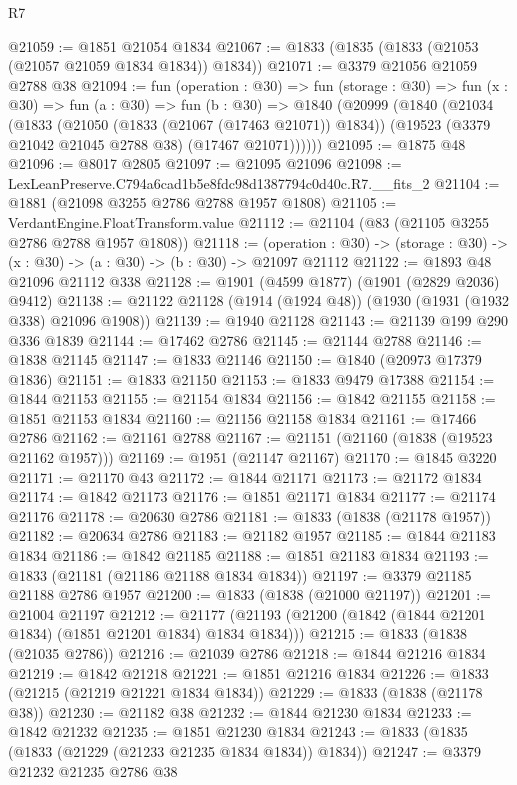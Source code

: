 \begin{lexlean}{R7}
\begin{coremodule}
@21059 := @1851 @21054 @1834
@21067 := @1833 (@1835 (@1833 (@21053 (@21057 @21059 @1834 @1834)) @1834))
@21071 := @3379 @21056 @21059 @2788 @38
@21094 := fun (operation : @30) =>
  fun (storage : @30) =>
  fun (x : @30) =>
  fun (a : @30) =>
  fun (b : @30) =>
  @1840
    (@20999
      (@1840
        (@21034
          (@1833
            (@21050 (@1833 (@21067 (@17463 @21071)) @1834))
            (@19523 (@3379 @21042 @21045 @2788 @38) (@17467 @21071))))))
@21095 := @1875 @48
@21096 := @8017 @2805
@21097 := @21095 @21096
@21098 := LexLeanPreserve.C794a6cad1b5e8fdc98d1387794c0d40c.R7.__fits_2
@21104 := @1881 (@21098 @3255 @2786 @2788 @1957 @1808)
@21105 := VerdantEngine.FloatTransform.value
@21112 := @21104 (@83 (@21105 @3255 @2786 @2788 @1957 @1808))
@21118 := (operation : @30) ->
  (storage : @30) -> (x : @30) -> (a : @30) -> (b : @30) -> @21097 @21112
@21122 := @1893 @48 @21096 @21112 @338
@21128 := @1901 (@4599 @1877) (@1901 (@2829 @2036) @9412)
@21138 := @21122 @21128 (@1914 (@1924 @48)) (@1930 (@1931 (@1932 @338) @21096 @1908))
@21139 := @1940 @21128
@21143 := @21139 @199 @290 @336 @1839
@21144 := @17462 @2786
@21145 := @21144 @2788
@21146 := @1838 @21145
@21147 := @1833 @21146
@21150 := @1840 (@20973 @17379 @1836)
@21151 := @1833 @21150
@21153 := @1833 @9479 @17388
@21154 := @1844 @21153
@21155 := @21154 @1834
@21156 := @1842 @21155
@21158 := @1851 @21153 @1834
@21160 := @21156 @21158 @1834
@21161 := @17466 @2786
@21162 := @21161 @2788
@21167 := @21151 (@21160 (@1838 (@19523 @21162 @1957)))
@21169 := @1951 (@21147 @21167)
@21170 := @1845 @3220
@21171 := @21170 @43
@21172 := @1844 @21171
@21173 := @21172 @1834
@21174 := @1842 @21173
@21176 := @1851 @21171 @1834
@21177 := @21174 @21176
@21178 := @20630 @2786
@21181 := @1833 (@1838 (@21178 @1957))
@21182 := @20634 @2786
@21183 := @21182 @1957
@21185 := @1844 @21183 @1834
@21186 := @1842 @21185
@21188 := @1851 @21183 @1834
@21193 := @1833 (@21181 (@21186 @21188 @1834 @1834))
@21197 := @3379 @21185 @21188 @2786 @1957
@21200 := @1833 (@1838 (@21000 @21197))
@21201 := @21004 @21197
@21212 := @21177 (@21193 (@21200 (@1842 (@1844 @21201 @1834) (@1851 @21201 @1834) @1834 @1834)))
@21215 := @1833 (@1838 (@21035 @2786))
@21216 := @21039 @2786
@21218 := @1844 @21216 @1834
@21219 := @1842 @21218
@21221 := @1851 @21216 @1834
@21226 := @1833 (@21215 (@21219 @21221 @1834 @1834))
@21229 := @1833 (@1838 (@21178 @38))
@21230 := @21182 @38
@21232 := @1844 @21230 @1834
@21233 := @1842 @21232
@21235 := @1851 @21230 @1834
@21243 := @1833 (@1835 (@1833 (@21229 (@21233 @21235 @1834 @1834)) @1834))
@21247 := @3379 @21232 @21235 @2786 @38

\end{coremodule}
\end{lexlean}
